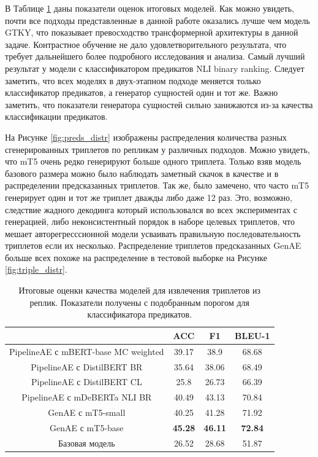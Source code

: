 В Таблице \ref{table:final_results} даны показатели оценок итоговых моделей. Как можно увидеть, почти все подходы представленные в данной работе оказались лучше чем модель GTKY, что показывает превосходство трансформерной архитектуры в данной задаче. Контрастное обучение не дало удовлетворительного результата, что требует дальнейшего более подробного исследования и анализа. Самый лучший результат у модели с классификатором предикатов NLI binary ranking. Следует заметить, что всех моделях в двух-этапном подходе меняется только классификатор предикатов, а генератор сущностей один и тот же. Важно заметить, что показатели генератора сущностей сильно занижаются из-за качества классификации предикатов.

На Рисунке \ref{fig:preds_distr} изображены распределения количества разных сгенерированных триплетов по репликам у различных подходов. Можно увидеть, что mT5 очень редко генерируют больше одного триплета. Только взяв модель базового размера можно было наблюдать заметный скачок в качестве и в распределении предсказанных триплетов. Так же, было замечено, что часто mT5 генерирует один и тот же триплет дважды либо даже 12 раз. Это, возможно, следствие жадного декодинга который использовался во всех экспериментах с генерацией, либо неконсистентный порядок в наборе целевых триплетов, что мешает авторегресссионной модели усваивать правильную последовательность триплетов если их несколько. Распределение триплетов предсказанных GenAE больше всех похоже на распределение в тестовой выборке на Рисунке \ref{fig:triple_distr}.

\begin{table}[!ht]
\centering
\begin{tabular}{c c c c}
    & \textbf{ACC} & \textbf{F1} & \textbf{BLEU-1} \\
    \hline
    \hline
    PipelineAE с mBERT-base MC weighted & 39.17 & 38.9 & 68.68  \\
    \hline
    PipelineAE с DistilBERT BR & 35.64 & 38.06 & 68.49  \\
    \hline
    PipelineAE с DistilBERT CL & 25.8 & 26.73 & 66.39 \\
    \hline
    PipelineAE с mDeBERTa NLI BR & 40.49 & 43.13 & 70.84 \\
    \hline
    GenAE с mT5-small & 40.25 & 41.28 & 71.92 \\
    \hline
    GenAE с mT5-base & \textbf{45.28} & \textbf{46.11} & \textbf{72.84} \\
    \hline
    Базовая модель & 26.52 & 28.68 & 51.87 \\
    \hline
\end{tabular}
\caption{Итоговые оценки качества моделей для извлечения триплетов из реплик. Показатели получены с подобранным порогом для классификатора предикатов.}
\label{table:final_results}
\end{table}

